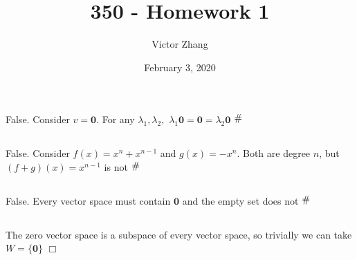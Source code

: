 \documentclass{article}
\title{350 - Homework 1}
\author{Victor Zhang }
\date{February 3, 2020}
\newcommand{\contra}{\raisebox{\depth}{\#}}
\begin{document}
\maketitle

\section{}
\subsection{}
False. Consider $v = \pmb{0}$. For any $\lambda_1, \lambda_2,$ $\lambda_1\pmb{0} = \pmb{0} = \lambda_2\pmb{0}$ $\contra$
\subsection{}
False. Consider $f(x) = x^n + x^{n-1}$ and $g(x) = -x^n$. Both are degree $n$, but $(f+g)(x) = x^{n-1}$ is not $\contra$
\subsection{}
False. Every vector space must contain $\pmb{0}$ and the empty set does not $\contra$
\subsection{}
The zero vector space is a subspace of every vector space, so trivially we can take $W = \{\pmb{0}\}$ $\Box$
\end{document}
